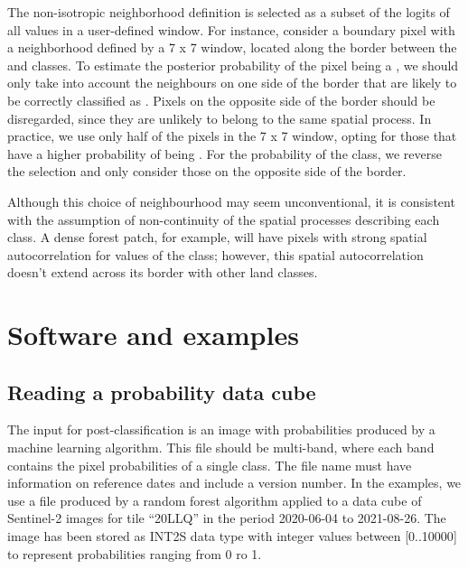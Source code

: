 \documentclass[
  shortnames]{jss}
\begin{document}
The non-isotropic neighborhood definition is selected as a subset of the logits of all values in a user-defined window. For instance, consider a boundary pixel with a neighborhood defined by a 7 x 7 window, located along the border between the  and  classes. To estimate the posterior probability of the pixel being a , we should only take into account the neighbours on one side of the border that are likely to be correctly classified as . Pixels on the opposite side of the border should be disregarded, since they are unlikely to belong to the same spatial process. In practice, we use only half of the pixels in the 7 x 7 window, opting for those that have a higher probability of being . For the probability of the  class, we reverse the selection and only consider those on the opposite side of the border.

Although this choice of neighbourhood may seem unconventional, it is consistent with the assumption of non-continuity of the spatial processes describing each class. A dense forest patch, for example, will have pixels with strong spatial autocorrelation for values of the  class; however, this spatial autocorrelation doesn't extend across its border with other land classes.

\hypertarget{software-and-examples}{%
\section{Software and examples}\label{software-and-examples}}

\hypertarget{reading-a-probability-data-cube}{%
\subsection{Reading a probability data cube}\label{reading-a-probability-data-cube}}

The input for post-classification is an image with probabilities produced by a machine learning algorithm. This file should be multi-band, where each band contains the pixel probabilities of a single class. The file name must have information on reference dates and include a version number. In the examples, we use a file produced by a random forest algorithm applied to a data cube of Sentinel-2 images for tile ``20LLQ'' in the period 2020-06-04 to 2021-08-26. The image has been stored as INT2S data type with integer values between {[}0..10000{]} to represent probabilities ranging from 0 ro 1.
\end{document}
